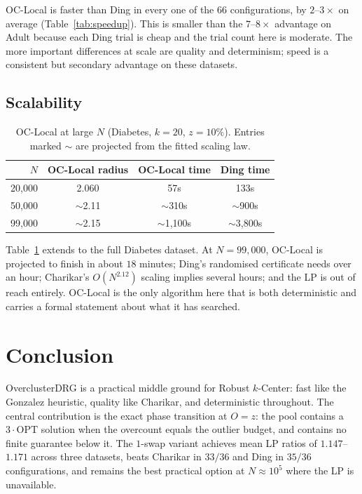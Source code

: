 \documentclass{siam}
\newcommand{\OPT}{\mathrm{OPT}}
\begin{document}
OC-Local is faster than Ding in every one of the $66$ configurations,
by $2$--$3\times$ on average (Table~\ref{tab:speedup}). This is smaller
than the $7$--$8\times$ advantage on Adult because each Ding trial is
cheap and the trial count here is moderate. The more important
differences at scale are quality and determinism; speed is a consistent
but secondary advantage on these datasets.

\subsection{Scalability}
\label{sec:scalability}

\begin{table}[t]
\caption{OC-Local at large $N$ (Diabetes, $k=20$, $z=10\%$).
Entries marked $\sim$ are projected from the fitted scaling law.}
\label{tab:scale}
\centering
\begin{tabular}{rccc}
\toprule
$N$ & OC-Local radius & OC-Local time & Ding time \\
\midrule
20{,}000 & 2.060 & 57s & 133s \\
50{,}000 & $\sim$2.11 & $\sim$310s & $\sim$900s \\
99{,}000 & $\sim$2.15 & $\sim$1{,}100s & $\sim$3{,}800s \\
\bottomrule
\end{tabular}
\end{table}

Table~\ref{tab:scale} extends to the full Diabetes dataset. At
$N=99{,}000$, OC-Local is projected to finish in about $18$ minutes;
Ding's randomised certificate needs over an hour; Charikar's
$O(N^{2.12})$ scaling implies several hours; and the LP is out of
reach entirely. OC-Local is the only algorithm here that is both
deterministic and carries a formal statement about what it has
searched.

\section{Conclusion}

OverclusterDRG is a practical middle ground for Robust $k$-Center: fast
like the Gonzalez heuristic, quality like Charikar, and deterministic
throughout. The central contribution is the exact phase transition at
$O=z$: the pool contains a $3\cdot\OPT$ solution when the overcount
equals the outlier budget, and contains no finite guarantee below it.
The $1$-swap variant achieves mean LP ratios of $1.147$--$1.171$ across
three datasets, beats Charikar in $33/36$ and Ding in $35/36$
configurations, and remains the best practical option at $N\approx
10^{5}$ where the LP is unavailable.
\end{document}
